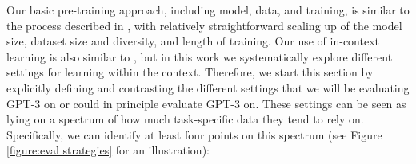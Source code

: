 

Our basic pre-training approach, including model, data, and training, is similar to the process described in \cite{radford2019language}, with relatively straightforward scaling up of the model size, dataset size and diversity, and length of training.  Our use of in-context learning is also similar to \cite{radford2019language}, but in this work we systematically explore different settings for learning within the context.  Therefore, we start this section by explicitly defining and contrasting the different settings that we will be evaluating GPT-3 on or could in principle evaluate GPT-3 on. These settings can be seen as lying on a spectrum of how much task-specific data they tend to rely on.  Specifically, we can identify at least four points on this spectrum (see Figure \ref{figure:eval strategies} for an illustration):

